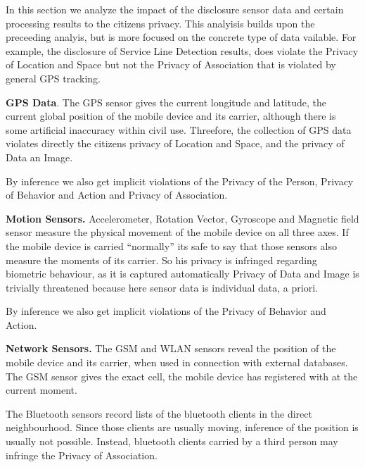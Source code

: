 \documentclass[runningheads,a4paper]{llncs}
\newenvironment{LGContent}
{ \par\color{blue} \it \small }
{ \par }
\begin{document}
\begin{LGContent}




In this section we analyze the impact of the disclosure sensor data and certain processing results to the citizens privacy.
This analyisis builds upon the preceeding analyis, but is more focused on the concrete type of data vailable.
For example, the disclosure of Service Line Detection results, does violate the Privacy of Location and Space but not the Privacy of Association that is violated by general GPS tracking.

\textbf{GPS Data}.
The GPS sensor gives the current longitude and latitude, the current global position of the mobile device and its carrier, although there is some artificial inaccuracy within civil use. Threefore, the collection of GPS data violates directly the citizens privacy of Location and Space, and the privacy of Data an Image.

By inference we also get implicit violations of the Privacy of the Person, Privacy of Behavior and Action and Privacy of Association.

\textbf{Motion Sensors.}
Accelerometer, Rotation Vector, Gyroscope and Magnetic field sensor measure the physical movement of the mobile device on all three axes.
If the mobile device is carried ``normally'' its safe to say that those sensors also measure the moments of its carrier.
So his privacy is infringed regarding biometric behaviour, as it is captured automatically
Privacy of Data and Image is trivially threatened because here sensor data is individual data, a priori.

By inference we also get implicit violations of the Privacy of Behavior and Action.

\textbf{Network Sensors.}
The GSM and WLAN sensors reveal the position of the mobile device and its carrier, when used in connection with external databases.
The GSM sensor gives the exact cell, the mobile device has registered with at the current moment.

The Bluetooth sensors record lists of the bluetooth clients in the direct neighbourhood.
Since those clients are usually moving, inference of the position is usually not possible.
Instead, bluetooth clients carried by a third person may infringe the Privacy of Association.


\end{LGContent}
\end{document}

